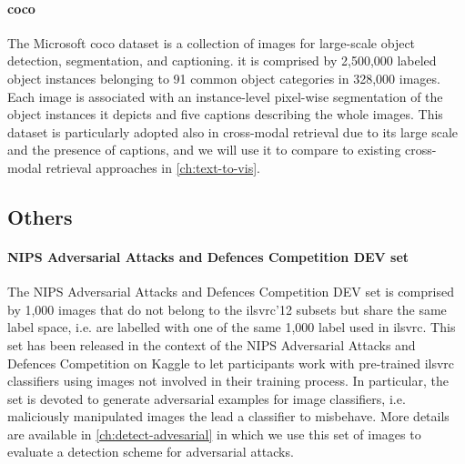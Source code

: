 \paragraph{\acrfull{coco}~\cite{lin2014microsoft}}

The Microsoft \acrfull{coco} dataset is a collection of images  for large-scale object detection, segmentation, and captioning.
it is comprised by 2,500,000 labeled object instances belonging to 91 common object categories in 328,000 images.
Each image is associated with an instance-level pixel-wise segmentation of the object instances it depicts and five captions describing the whole images.
This dataset is particularly adopted also in cross-modal retrieval due to its large scale and the presence of captions, and we will use it to compare to existing cross-modal retrieval approaches in \ref{ch:text-to-vis}.

\subsection{Others}

\paragraph{NIPS Adversarial Attacks and Defences Competition DEV set~\cite{kurakin2018adversarial}}
The NIPS Adversarial Attacks and Defences Competition DEV set is comprised by 1,000 images that do not belong to the \gls{ilsvrc}'12 subsets but share the same label space, i.e. are labelled with one of the same 1,000 label used in \gls{ilsvrc}.
This set has been released in the context of the NIPS Adversarial Attacks and Defences Competition on Kaggle to let participants work with pre-trained \gls{ilsvrc} classifiers using images not involved in their training process.
In particular, the set is devoted to generate adversarial examples for image classifiers, i.e. maliciously manipulated images the lead a classifier to misbehave.
More details are available in \ref{ch:detect-advesarial} in which we use this set of images to evaluate a detection scheme for adversarial attacks.
